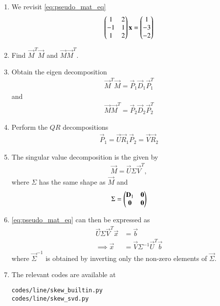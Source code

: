 \renewcommand{\theequation}{\theenumi}
\begin{enumerate}[label=\thesection.\arabic*.,ref=\thesection.\theenumi]

\item We revisit \eqref{eq:pseudo_mat_eq}
%
\begin{align}
\begin{pmatrix}
1 & 2
\\
-1 & 1
\\
1 & 2
\end{pmatrix}
\mathbf{x} =
\begin{pmatrix}1 \\ -3 \\ -2\end{pmatrix}
\end{align}

\item Find $\vec{M}^T\vec{M}$ and $\vec{M}\vec{M}^T$.
\item Obtain the eigen decomposition 
\begin{align}
\vec{M}^T\vec{M} = \vec{P}_1\vec{D}_1\vec{P}_1^T
\end{align}
and 
\begin{align}
\vec{M}\vec{M}^T = \vec{P}_2\vec{D}_2\vec{P}_2^T
\end{align}
\item Perform the $QR$ decompositions
\begin{align}
\vec{P}_1 = \vec{U}\vec{R}_1
\vec{P}_2 = \vec{V}\vec{R}_2
\end{align}
\item The singular value decomposition is the given by
\begin{align}
\vec{M} = \vec{U} \Sigma \vec{V}^T,
\end{align}
where $\Sigma$ has the same shape as $\vec{M}$ and
\begin{align}
\Sigma = \begin{pmatrix}\mathbf{D}_1 & \mathbf{0} \\ \mathbf{0} & \mathbf{0}\end{pmatrix}
\end{align}
\item \eqref{eq:pseudo_mat_eq} can then be expressed as
\begin{align}
\vec{U} \Sigma \vec{V}^T \vec{x} &= \vec{b}
\\
\implies \vec{x} & = \vec{V}\Sigma^{-1} \vec{U}^T \vec{b}
\end{align}
%
where $\vec{\Sigma}^{-1}$ is obtained by inverting  only the non-zero elements of $\vec{\Sigma}$.
\item The relevant codes are available at
\begin{lstlisting}
codes/line/skew_builtin.py
codes/line/skew_svd.py
\end{lstlisting}
\end{enumerate}
